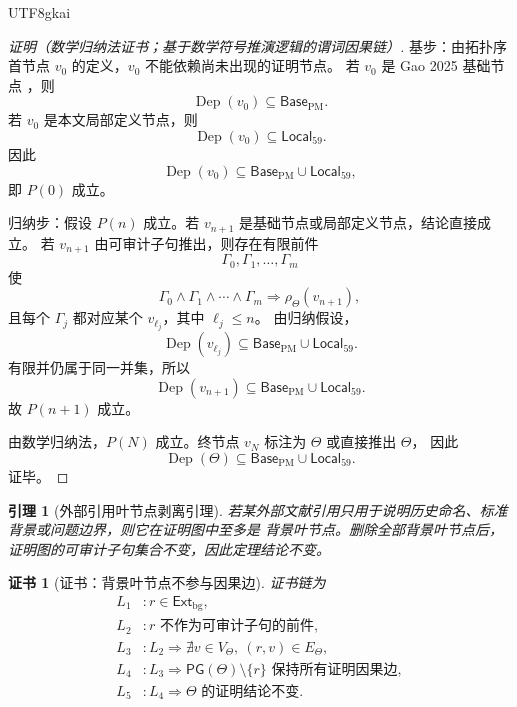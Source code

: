 \documentclass[12pt]{article}
\newtheorem{lemma}{引理}[section]
\newtheorem{Certificate}{证书}[section]
\DeclareMathOperator{\Dep}{Dep}
\begin{document}
\begin{CJK*}{UTF8}{gkai}
\begin{proof}[证明（数学归纳法证书；基于数学符号推演逻辑的谓词因果链）]
基步：由拓扑序首节点 \(v_0\) 的定义，\(v_0\) 不能依赖尚未出现的证明节点。
若 \(v_0\) 是 Gao 2025 基础节点 \cite{Gao2025PureMathZenodo}，则
\[
  \Dep(v_0)\subseteq\mathsf{Base}_{\mathrm{PM}}.
\]
若 \(v_0\) 是本文局部定义节点，则
\[
  \Dep(v_0)\subseteq\mathsf{Local}_{59}.
\]
因此
\[
  \Dep(v_0)\subseteq
  \mathsf{Base}_{\mathrm{PM}}\cup\mathsf{Local}_{59},
\]
即 \(P(0)\) 成立。

归纳步：假设 \(P(n)\) 成立。若 \(v_{n+1}\) 是基础节点或局部定义节点，结论直接成立。
若 \(v_{n+1}\) 由可审计子句推出，则存在有限前件
\[
  \Gamma_0,\Gamma_1,\ldots,\Gamma_m
\]
使
\[
  \Gamma_0\wedge\Gamma_1\wedge\cdots\wedge\Gamma_m
  \Rightarrow
  \rho_\Theta(v_{n+1}),
\]
且每个 \(\Gamma_j\) 都对应某个 \(v_{\ell_j}\)，其中 \(\ell_j\le n\)。
由归纳假设，
\[
  \Dep(v_{\ell_j})
  \subseteq
  \mathsf{Base}_{\mathrm{PM}}\cup\mathsf{Local}_{59}.
\]
有限并仍属于同一并集，所以
\[
  \Dep(v_{n+1})
  \subseteq
  \mathsf{Base}_{\mathrm{PM}}\cup\mathsf{Local}_{59}.
\]
故 \(P(n+1)\) 成立。

由数学归纳法，\(P(N)\) 成立。终节点 \(v_N\) 标注为 \(\Theta\) 或直接推出 \(\Theta\)，
因此
\[
  \Dep(\Theta)
  \subseteq
  \mathsf{Base}_{\mathrm{PM}}\cup\mathsf{Local}_{59}.
\]
证毕。
\end{proof}

\begin{lemma}[外部引用叶节点剥离引理]
\label{lem:tex59-external-leaf-pruning}
若某外部文献引用只用于说明历史命名、标准背景或问题边界，则它在证明图中至多是
背景叶节点。删除全部背景叶节点后，证明图的可审计子句集合不变，因此定理结论不变。
\end{lemma}

\begin{Certificate}[证书：背景叶节点不参与因果边]
\label{cert:tex59-external-leaf-pruning}
证书链为
\[
\begin{aligned}
  L_1 &: r\in\mathsf{Ext}_{\mathrm{bg}},\\
  L_2 &: r\text{ 不作为可审计子句的前件},\\
  L_3 &: L_2\Rightarrow
  \nexists v\in V_\Theta,\ (r,v)\in E_\Theta,\\
  L_4 &: L_3\Rightarrow
  \mathsf{PG}(\Theta)\setminus\{r\}
  \text{ 保持所有证明因果边},\\
  L_5 &: L_4\Rightarrow \Theta\text{ 的证明结论不变}.
\end{aligned}
\]
\end{Certificate}


\end{CJK*}
\end{document}
